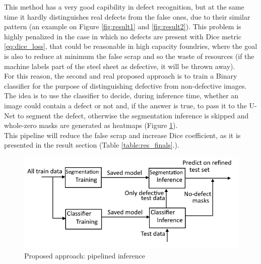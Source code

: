 \documentclass[10pt,twocolumn,letterpaper]{article}
\begin{document}
   This method has a very good capibility in defect recognition, but at the same time it hardly distinguishes real defects from the false ones, due to their similar pattern (an example on Figure \ref{fig:result1} and \ref{fig:result2}). This problem is highly penalized in the case in which no defects are present with Dice metric \eqref{eq:dice_loss}, that could be reasonable in high capacity foundries, where the goal is also to reduce at minimum the false scrap and so the waste of resources (if the machine labels part of the steel sheet as defective, it will be thrown away).\\
   For this reason, the second and real proposed approach is to train a Binary classifier for the purpose of distinguishing defective from non-defective images. The idea is to use the classifier to decide, during inference time, whether an image could contain a defect or not and, if the answer is true, to pass it to the U-Net to segment the defect, otherwise the segmentation inference is skipped and whole-zero masks are generated as heatmaps (Figure \ref{fig:secondApproach}).\\
   This pipeline will reduce the false scrap and increase Dice coefficient, as it is presented in the result section (Table \ref{table:res_finals}.).
    
   \begin{figure}[h]
      \caption{Proposed approach: pipelined inference } \label{fig:secondApproach}
      \includegraphics[scale=0.48]{Img_SecondApproach}
   \end{figure}
\end{document}
